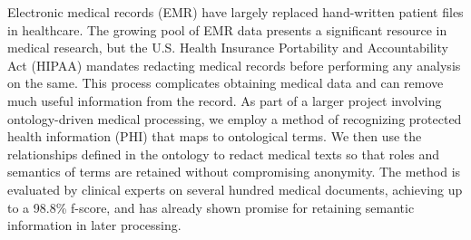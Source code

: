 Electronic medical records (EMR) have largely replaced hand-written patient files in healthcare. The growing pool of EMR data presents a significant resource in medical research, but the U.S. Health Insurance Portability and Accountability Act (HIPAA) mandates redacting medical records before performing any analysis on the same. This process complicates obtaining medical data and can remove much useful information from the record. As part of a larger project involving ontology-driven medical processing, we employ a method of recognizing protected health information (PHI) that maps to ontological terms. We then use the relationships defined in the ontology to redact medical texts so that roles and semantics of terms are retained without compromising anonymity. The method is evaluated by clinical experts on several hundred medical documents, achieving up to a 98.8\% f-score, and has already shown promise for retaining semantic information in later processing.
